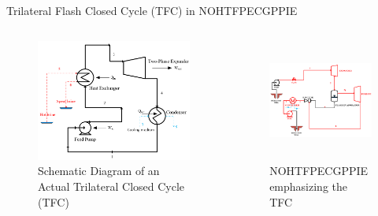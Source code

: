 \begin{frame}{Trilateral Flash Closed Cycle (TFC) in NOHTFPECGPPIE}
\begin{columns}
    \begin{figure}[h]
      \centering
      \includegraphics[height=4cm]{images/TLC.png}
      \caption{\scriptsize Schematic Diagram of an Actual Trilateral Closed Cycle (TFC) \cite{smith2014power}}
   \end{figure}
    \begin{figure}[h]
    \centering
    \includegraphics[height=4cm]{images/nohtfpecgppietfc1.png}
    \caption{\scriptsize NOHTFPECGPPIE emphasizing the TFC}
    \end{figure}
\end{columns}
\end{frame}

